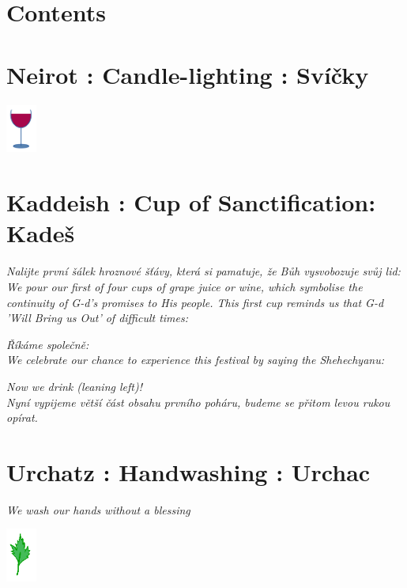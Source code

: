 \documentclass[a5paper,10pt]{memoir}
\begin{document}
\section{Contents}
\ContentsColumnar
%
\vspace*{-4ex}
\section{Neirot : Candle-lighting : Svíčky}

\Neirot
\vspace*{2ex}
\hfill\includegraphics[width=10mm]{cup}
\vspace*{-15ex}  %
		
\section{Kaddeish : Cup of Sanctification: Kadeš}
\begin{paracol}{2}
	{\textit{Nalijte první šálek hroznové šťávy, která si pamatuje, že Bůh vysvobozuje svůj lid:} \vspace*{2ex}\\
	\color{midblue}\textit{We pour our first of four cups of grape juice or wine, which symbolise the continuity of G-d's promises to His people. This first cup reminds us that G-d 'Will Bring us Out' of difficult times:}}
\end{paracol}
\Kaddeish
\textit{Říkáme společně:}
\\
\color{midblue}\textit{We celebrate our chance to experience this festival by saying the Shehechyanu:}
\color{black}
\Shehechyanu
\begin{center}
	\textit{\centering \color{midblue} Now we drink (leaning left)!} \\
	\textit{Nyní  vypijeme větší část obsahu prvního poháru, budeme se přitom levou rukou opírat.}
	\end{center}
\vspace*{2ex}
\section{Urchatz : Handwashing : Urchac}
\begin{center}
	{\color{midblue} \textit{We wash our hands without a blessing}}\\
	\urchatz
	\end{center}
% 
\vspace*{-3ex}
\hfill\includegraphics[width=10mm]{Karpas}
\vspace*{-12ex}  %
\end{document}
